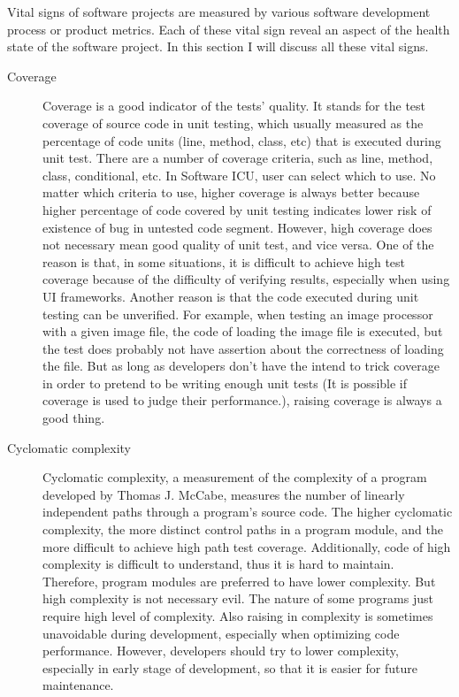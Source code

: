 Vital signs of software projects are measured by various software development process or product metrics. Each of these vital sign reveal an aspect of the health state of the software project. In this section I will discuss all these vital signs.
\begin{description}
\item[Coverage] 
Coverage is a good indicator of the tests' quality. It stands for the test coverage of source code in unit testing, which usually measured as the percentage of code units (line, method, class, etc) that is executed during unit test. There are a number of coverage criteria, such as line, method, class, conditional, etc. In Software ICU, user can select which to use. No matter which criteria to use, higher coverage is always better because higher percentage of code covered by unit testing indicates lower risk of existence of bug in untested code segment. However, high coverage does not necessary mean good quality of unit test, and vice versa. One of the reason is that, in some situations, it is difficult to achieve high test coverage because of the difficulty of verifying results, especially when using UI frameworks. Another reason is that the code executed during unit testing can be unverified. For example, when testing an image processor with a given image file, the code of loading the image file is executed, but the test does probably not have assertion about the correctness of loading the file. But as long as developers don't have the intend to trick coverage in order to pretend to be writing enough unit tests (It is possible if coverage is used to judge their performance.), raising coverage is always a good thing.

\item[Cyclomatic complexity] 
Cyclomatic complexity, a measurement of the complexity of a program developed by Thomas J. McCabe, measures the number of linearly independent paths through a program's source code\cite{mccabe:complexity}. The higher cyclomatic complexity, the more distinct control paths in a program module, and the more difficult to achieve high path test coverage. Additionally, code of high complexity is difficult to understand, thus it is hard to maintain. Therefore, program modules are preferred to have lower complexity. But high complexity is not necessary evil. The nature of some programs just require high level of complexity. Also raising in complexity is sometimes unavoidable during development, especially when optimizing code performance. However, developers should try to lower complexity, especially in early stage of development, so that it is easier for future maintenance.


\end{description}
